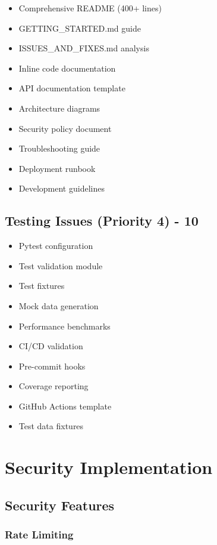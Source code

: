 \documentclass[12pt,a4paper]{report}
\begin{document}
\begin{itemize}
    \item Comprehensive README (400+ lines)
    \item GETTING\_STARTED.md guide
    \item ISSUES\_AND\_FIXES.md analysis
    \item Inline code documentation
    \item API documentation template
    \item Architecture diagrams
    \item Security policy document
    \item Troubleshooting guide
    \item Deployment runbook
    \item Development guidelines
\end{itemize}

\section{Testing Issues (Priority 4) - 10}

\begin{itemize}
    \item Pytest configuration
    \item Test validation module
    \item Test fixtures
    \item Mock data generation
    \item Performance benchmarks
    \item CI/CD validation
    \item Pre-commit hooks
    \item Coverage reporting
    \item GitHub Actions template
    \item Test data fixtures
\end{itemize}

\chapter{Security Implementation}

\section{Security Features}

\subsection{Rate Limiting}
\end{document}
